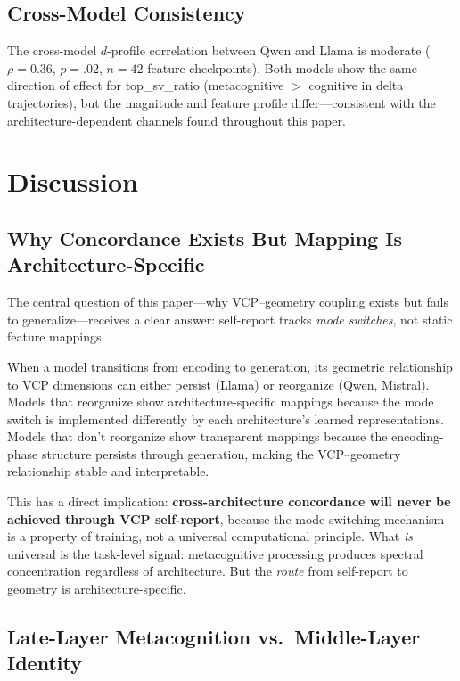 \documentclass[11pt,a4paper]{article}
\begin{document}
\subsection{Cross-Model Consistency}

The cross-model $d$-profile correlation between Qwen and Llama is moderate ($\rho = 0.36$, $p = .02$, $n = 42$ feature-checkpoints). Both models show the same direction of effect for top\_sv\_ratio (metacognitive $>$ cognitive in delta trajectories), but the magnitude and feature profile differ---consistent with the architecture-dependent channels found throughout this paper.

\section{Discussion}

\subsection{Why Concordance Exists But Mapping Is Architecture-Specific}

The central question of this paper---why VCP--geometry coupling exists but fails to generalize---receives a clear answer: self-report tracks \emph{mode switches}, not static feature mappings.

When a model transitions from encoding to generation, its geometric relationship to VCP dimensions can either persist (Llama) or reorganize (Qwen, Mistral). Models that reorganize show architecture-specific mappings because the mode switch is implemented differently by each architecture's learned representations. Models that don't reorganize show transparent mappings because the encoding-phase structure persists through generation, making the VCP--geometry relationship stable and interpretable.

This has a direct implication: \textbf{cross-architecture concordance will never be achieved through VCP self-report}, because the mode-switching mechanism is a property of training, not a universal computational principle. What \emph{is} universal is the task-level signal: metacognitive processing produces spectral concentration regardless of architecture. But the \emph{route} from self-report to geometry is architecture-specific.

\subsection{Late-Layer Metacognition vs.\ Middle-Layer Identity}
\end{document}
